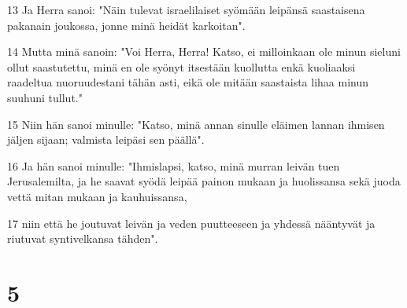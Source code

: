 \par 13 Ja Herra sanoi: "Näin tulevat israelilaiset syömään leipänsä saastaisena pakanain joukossa, jonne minä heidät karkoitan".
\par 14 Mutta minä sanoin: "Voi Herra, Herra! Katso, ei milloinkaan ole minun sieluni ollut saastutettu, minä en ole syönyt itsestään kuollutta enkä kuoliaaksi raadeltua nuoruudestani tähän asti, eikä ole mitään saastaista lihaa minun suuhuni tullut."
\par 15 Niin hän sanoi minulle: "Katso, minä annan sinulle eläimen lannan ihmisen jäljen sijaan; valmista leipäsi sen päällä".
\par 16 Ja hän sanoi minulle: "Ihmislapsi, katso, minä murran leivän tuen Jerusalemilta, ja he saavat syödä leipää painon mukaan ja huolissansa sekä juoda vettä mitan mukaan ja kauhuissansa,
\par 17 niin että he joutuvat leivän ja veden puutteeseen ja yhdessä nääntyvät ja riutuvat syntivelkansa tähden".

\chapter{5}

